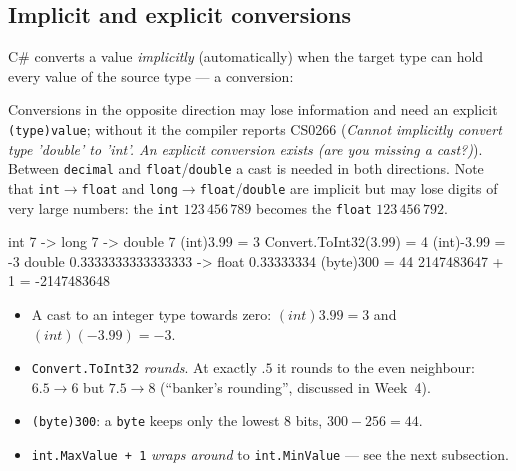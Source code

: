 \subsection{Implicit and explicit conversions}
C\# converts a value \emph{implicitly} (automatically) when the target type can hold every value of the source type --- a  conversion:
\begin{center}
\end{center}
Conversions in the opposite direction may lose information and need an explicit  \texttt{(type)value}; without it the compiler reports CS0266 (\emph{Cannot implicitly convert type 'double' to 'int'. An explicit conversion exists (are you missing a cast?)}). Between \texttt{decimal} and \texttt{float}/\texttt{double} a cast is needed in both directions. Note that \texttt{int}$\to$\texttt{float} and \texttt{long}$\to$\texttt{float}/\texttt{double} are implicit but may lose digits of very large numbers: the \texttt{int} $123\,456\,789$ becomes the \texttt{float} $123\,456\,792$.


\begin{consolebox}[Output]
\begin{run}
int 7 -> long 7 -> double 7
(int)3.99 = 3
Convert.ToInt32(3.99) = 4
(int)-3.99 = -3
double 0.3333333333333333 -> float 0.33333334
(byte)300 = 44
2147483647 + 1 = -2147483648
\end{run}
\end{consolebox}
\begin{itemize}[leftmargin=*,itemsep=1pt]
  \item A cast to an integer type  towards zero: $(int)3.99 = 3$ and $(int)(-3.99) = -3$.
  \item \texttt{Convert.ToInt32} \emph{rounds}. At exactly $.5$ it rounds to the even neighbour: $6.5 \to 6$ but $7.5 \to 8$ (``banker's rounding'', discussed in Week~4).
  \item \texttt{(byte)300}: a \texttt{byte} keeps only the lowest 8 bits, $300 - 256 = 44$.
  \item \texttt{int.MaxValue + 1} \emph{wraps around} to \texttt{int.MinValue} --- see the next subsection.
\end{itemize}

